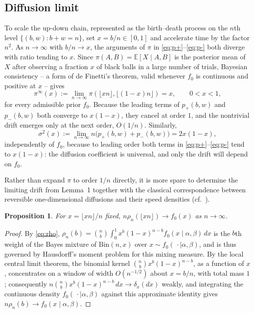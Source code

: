 \documentclass[11pt,reqno]{amsart}
\newtheorem{proposition}[theorem]{Proposition}
\theoremstyle{definition}
\theoremstyle{remark}
\numberwithin{equation}{section}
\begin{document}
\subsection{Diffusion limit}

To scale the up-down chain, represented as the birth--death process on the \(n\)th level \(\{(b,w):b+w=n\}\), set \(x=b/n\in[0,1]\) and accelerate time by the factor \(n^2\). As \(n\to\infty\) with \(b/n\to x\), the arguments of \(\pi\) in \eqref{eq:p+}--\eqref{eq:p-} both diverge with ratio tending to \(x\). Since \(\pi(A,B)=\mathbb{E}[X\mid A,B]\) is the posterior mean of \(X\) after observing a fraction \(x\) of black balls in a large number of trials, Bayesian consistency -- a form of de Finetti's theorem, valid whenever \(f_0\) is continuous and positive at \(x\) -- gives
\begin{equation}\label{eq:piinf}
\pi^\infty(x):=\lim_{n\to\infty}\pi(\lfloor xn\rfloor,\lfloor(1-x)n\rfloor)=x,\qquad0<x<1,
\end{equation}
for every admissible prior \(f_0\). Because the leading terms of \(p_+(b,w)\) and \(p_-(b,w)\) both converge to \(x(1-x)\), they cancel at order \(1\), and the nontrivial drift emerges only at the next order, \(O(1/n)\). Similarly,
\begin{equation}\label{eq:sigma}
\sigma^2(x):=\lim_{n\to\infty}n\bigl(p_+(b,w)+p_-(b,w)\bigr)=2x(1-x),
\end{equation}
independently of \(f_0\), because to leading order both terms in \eqref{eq:p+}--\eqref{eq:p-} tend to \(x(1-x)\): the diffusion coefficient is universal, and only the drift will depend on \(f_0\).

Rather than expand \(\pi\) to order \(1/n\) directly, it is more spare to determine the limiting drift from Lemma~1 together with the classical correspondence between reversible one-dimensional diffusions and their speed densities (cf.\ \cite{EthierKurtz1986}).

\begin{proposition}
For \(x=\lfloor xn\rfloor/n\) fixed, \(n\rho_n(\lfloor xn\rfloor)\to f_0(x)\) as \(n\to\infty\).
\end{proposition}

\begin{proof}
By \eqref{eq:rho}, \(\rho_n(b)=\binom{n}{b}\int_0^1 x^b(1-x)^{n-b}f_0(x\mid\alpha,\beta)\,dx\) is the \(b\)th weight of the Bayes mixture of \(\mathrm{Bin}(n,x)\) over \(x\sim f_0(\,\cdot\mid\alpha,\beta)\), and is thus governed by Hausdorff's moment problem \cite{Hausdorff1921a,Hausdorff1921b} for this mixing measure. By the local central limit theorem, the binomial kernel \(\binom{n}{b}x^b(1-x)^{n-b}\), as a function of \(x\), concentrates on a window of width \(O(n^{-1/2})\) about \(x=b/n\), with total mass \(1\); consequently \(n\binom{n}{b}x^b(1-x)^{n-b}\,dx\to\delta_x(dx)\) weakly, and integrating the continuous density \(f_0(\,\cdot\mid\alpha,\beta)\) against this approximate identity gives \(n\rho_n(b)\to f_0(x\mid\alpha,\beta)\).
\end{proof}
\end{document}
